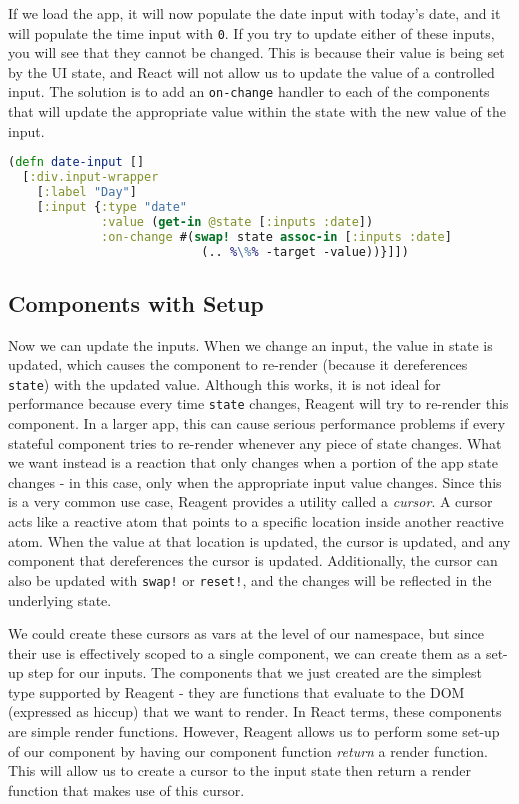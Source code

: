 \documentclass[10pt,twoside,openright]{memoir}
\begin{document}
If we load the app, it will now populate the date input with today's
date, and it will populate the time input with \texttt{0}. If you try to
update either of these inputs, you will see that they cannot be changed.
This is because their value is being set by the UI state, and React will
not allow us to update the value of a controlled input. The solution is
to add an \texttt{on-change} handler to each of the components that will
update the appropriate value within the state with the new value of the
input.

\begin{lstlisting}[language=Clojure]
(defn date-input []
  [:div.input-wrapper
    [:label "Day"]
    [:input {:type "date"
             :value (get-in @state [:inputs :date])
             :on-change #(swap! state assoc-in [:inputs :date]
                           (.. %\%% -target -value))}]])
\end{lstlisting}


\subsection{Components with Setup}

Now we can update the inputs. When we change an input, the value in
state is updated, which causes the component to re-render (because it
dereferences \texttt{state}) with the updated value. Although this
works, it is not ideal for performance because every time \texttt{state}
changes, Reagent will try to re-render this component. In a larger app,
this can cause serious performance problems if every stateful component
tries to re-render whenever any piece of state changes. What we want
instead is a reaction that only changes when a portion of the app state
changes - in this case, only when the appropriate input value changes.
Since this is a very common use case, Reagent provides a utility called
a \emph{cursor}. A cursor acts like a reactive atom that points to a
specific location inside another reactive atom. When the value at that
location is updated, the cursor is updated, and any component that
dereferences the cursor is updated. Additionally, the cursor can also be
updated with \texttt{swap!} or \texttt{reset!}, and the changes will be
reflected in the underlying state.

We could create these cursors as vars at the level of our namespace, but
since their use is effectively scoped to a single component, we can
create them as a set-up step for our inputs. The components that we just
created are the simplest type supported by Reagent - they are functions
that evaluate to the DOM (expressed as hiccup) that we want to render.
In React terms, these components are simple render functions. However,
Reagent allows us to perform some set-up of our component by having our
component function \emph{return} a render function. This will allow us
to create a cursor to the input state then return a render function that
makes use of this cursor.
\end{document}
